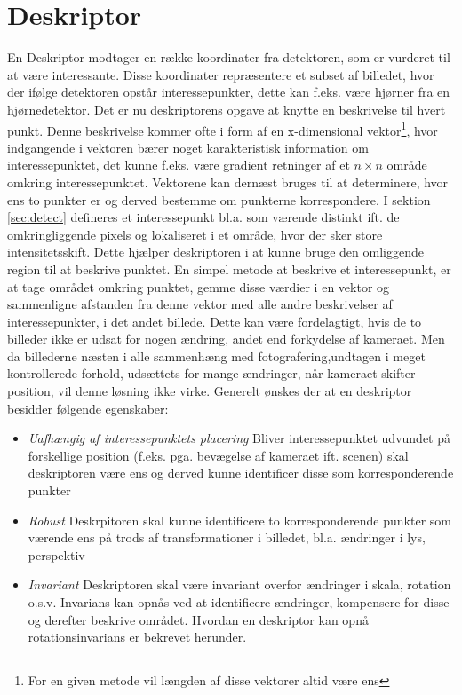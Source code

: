 \section{Deskriptor}
En Deskriptor modtager en række koordinater fra detektoren, som er vurderet til at være interessante.
Disse koordinater repræsentere et subset af billedet, hvor der ifølge detektoren opstår interessepunkter, dette kan f.eks. være hjørner fra en hjørnedetektor. 
 Det er nu deskriptorens opgave at knytte en beskrivelse til hvert punkt. Denne beskrivelse kommer ofte i form af en x-dimensional vektor\footnote{For en given metode vil længden af disse vektorer altid være ens}, hvor indgangende i vektoren bærer noget karakteristisk information om interessepunktet, det kunne f.eks. være gradient retninger af et $n \times n$ område omkring interessepunktet.
Vektorene kan dernæst bruges til at determinere, hvor ens to punkter er og derved bestemme om punkterne korrespondere. I sektion \ref{sec:detect} defineres et interessepunkt bl.a. som værende distinkt ift. de omkringliggende pixels og lokaliseret i et område, hvor der sker store intensitetsskift. Dette hjælper deskriptoren i at kunne bruge den omliggende region til at beskrive punktet. En simpel metode at beskrive et interessepunkt, er at tage området omkring punktet, gemme disse værdier i en vektor og sammenligne afstanden fra denne vektor med alle andre beskrivelser af interessepunkter, i det andet billede. Dette kan være fordelagtigt, hvis de to billeder ikke er udsat for nogen ændring, andet end forkydelse af kameraet. Men da billederne næsten i alle sammenhæng med fotografering,undtagen i meget kontrollerede forhold, udsættets for mange ændringer, når kameraet skifter position, vil denne løsning ikke virke. Generelt ønskes der at en deskriptor besidder følgende egenskaber:
\begin{itemize}
\item{ \textit{Uafhængig af interessepunktets placering}
Bliver interessepunktet udvundet på forskellige position  (f.eks. pga. bevægelse af kameraet ift. scenen) skal deskriptoren være ens og derved kunne identificer disse som korresponderende punkter
 }
\item{\textit{Robust} Deskrpitoren skal kunne identificere to korresponderende punkter som værende ens på trods af transformationer i billedet, bl.a. ændringer i lys, perspektiv}
\item{\textit{Invariant} Deskriptoren skal være invariant overfor ændringer i skala, rotation o.s.v. Invarians kan opnås ved at identificere ændringer, kompensere for disse og derefter beskrive området.
Hvordan en deskriptor kan opnå rotationsinvarians er bekrevet herunder.}
\end{itemize}
